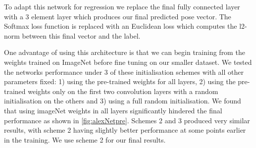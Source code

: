 \documentclass[11pt]{article} %
\begin{document}
\begin{figure}
\centering
{}%
\qquad
{}%
\caption{ }
\label{fig:LRN}
\end{figure}

To adapt this network for regression we replace the final fully connected layer with a 3 element layer which produces our final predicted pose vector. The Softmax loss function is replaced with an Euclidean loss which computes the l2-norm between this final vector and the label.

One advantage of using this architecture is that we can begin training from the weights trained on ImageNet before fine tuning on our smaller dataset. We tested the networks performance under 3 of these initialisation schemes with all other parameters fixed: 1) using the pre-trained weights for all layers, 2) using the pre-trained weights only on the first two convolution layers with a random initialisation on the others and 3) using a full random initialisation. We found that using imageNet weights in all layers significantly hindered the final performance as shown in \ref{fig:alexNetpre}. Schemes 2 and 3 produced very similar results, with scheme 2 having slightly better performance at some points earlier in the training. We use scheme 2 for our final results.
\end{document}
